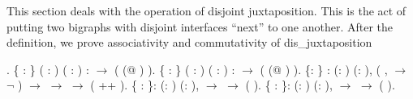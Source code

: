 \documentclass[12pt]{report}
\begin{document}
This section deals with the operation of disjoint juxtaposition. This is the act
of putting two bigraphs with disjoint interfaces ``next'' to one another. 
After the definition, we prove associativity and commutativity of dis\_juxtaposition \begin{coqdoccode}
\coqdocnoindent
{} .\coqdoceol
\coqdocindent{1.00em}
  \{  : \} ( :  ) ( :  ) :\coqdoceol
\coqdocindent{2.00em}
  \ensuremath{\rightarrow}  ( (@  ) ).\coqdoceol
\coqdocemptyline
\coqdocindent{1.00em}
  \{  : \} ( :  ) ( :  ) :\coqdoceol
\coqdocindent{2.00em}
  \ensuremath{\rightarrow}  ( (@  ) ).\coqdoceol
\coqdocemptyline
\coqdocindent{1.00em}
  \{: \} : \coqdockw{\ensuremath{\forall}} (: ) (: ),\coqdoceol
\coqdocindent{2.00em}
(\coqdockw{\ensuremath{\forall}} ,    \ensuremath{\rightarrow} \ensuremath{\lnot}   ) \ensuremath{\rightarrow}   \ensuremath{\rightarrow}   \ensuremath{\rightarrow}  ( ++ ).\coqdoceol
\coqdocemptyline
\coqdocindent{1.00em}
  \{ : \}: \coqdockw{\ensuremath{\forall}} (:  ) (:  ), \coqdoceol
\coqdocindent{2.00em}
  \ensuremath{\rightarrow}   \ensuremath{\rightarrow}  (  ).\coqdoceol
\coqdocemptyline
\coqdocindent{1.00em}
  \{ : \}: \coqdockw{\ensuremath{\forall}} (:  ) (:  ),   \ensuremath{\rightarrow}   \ensuremath{\rightarrow}  (  ).\coqdoceol

\end{coqdoccode}
\end{document}
